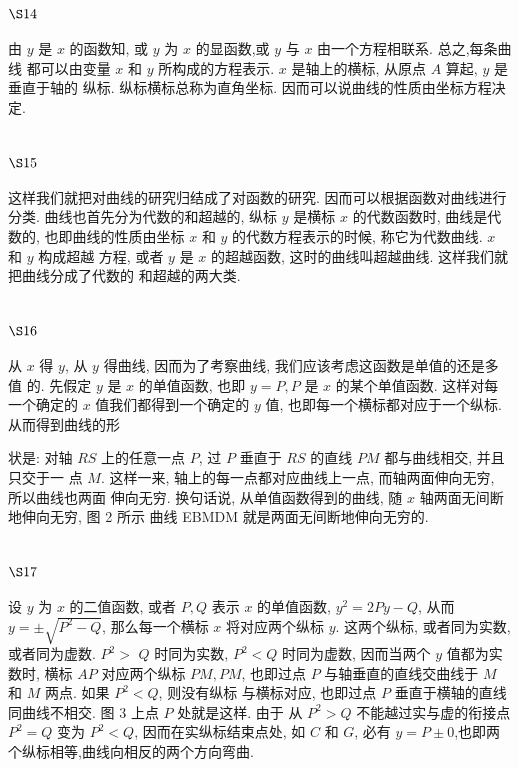 \section{$\S 14$}

由 $y$ 是 $x$ 的函数知, 或 $y$ 为 $x$ 的显函数,或 $y$ 与 $x$ 由一个方程相联系. 总之,每条曲线 都可以由变量 $x$ 和 $y$ 所构成的方程表示. $x$ 是轴上的横标, 从原点 $A$ 算起, $y$ 是垂直于轴的 纵标. 纵标横标总称为直角坐标. 因而可以说曲线的性质由坐标方程决定.

\section{$\S 15$}

这样我们就把对曲线的研究归结成了对函数的研究. 因而可以根据函数对曲线进行 分类. 曲线也首先分为代数的和超越的, 纵标 $y$ 是横标 $x$ 的代数函数时, 曲线是代数的, 也即曲线的性质由坐标 $x$ 和 $y$ 的代数方程表示的时候, 称它为代数曲线. $x$ 和 $y$ 构成超越 方程, 或者 $y$ 是 $x$ 的超越函数, 这时的曲线叫超越曲线. 这样我们就把曲线分成了代数的 和超越的两大类.

\section{$\S 16$}

从 $x$ 得 $y$, 从 $y$ 得曲线, 因而为了考察曲线, 我们应该考虑这函数是单值的还是多值 的. 先假定 $y$ 是 $x$ 的单值函数, 也即 $y=P, P$ 是 $x$ 的某个单值函数. 这样对每一个确定的 $x$ 值我们都得到一个确定的 $y$ 值, 也即每一个横标都对应于一个纵标. 从而得到曲线的形

状是: 对轴 $R S$ 上的任意一点 $P$, 过 $P$ 垂直于 $R S$ 的直线 $P M$ 都与曲线相交, 并且只交于一 点 $M$. 这样一来, 轴上的每一点都对应曲线上一点, 而轴两面伸向无穷, 所以曲线也两面 伸向无穷. 换句话说, 从单值函数得到的曲线, 随 $x$ 轴两面无间断地伸向无穷, 图 2 所示 曲线 EBMDM 就是两面无间断地伸向无穷的.

\section{$\S 17$}

设 $y$ 为 $x$ 的二值函数, 或者 $P, Q$ 表示 $x$ 的单值函数, $y^{2}=2 P y-Q$, 从而 $y=\pm \sqrt{P^{2}-Q}$, 那么每一个横标 $x$ 将对应两个纵标 $y$. 这两个纵标, 或者同为实数, 或者同为虚数. $P^{2}>$ $Q$ 时同为实数, $P^{2}<Q$ 时同为虚数, 因而当两个 $y$ 值都为实数时, 横标 $A P$ 对应两个纵标 $P M, P M$, 也即过点 $P$ 与轴垂直的直线交曲线于 $M$ 和 $M$ 两点. 如果 $P^{2}<Q$, 则没有纵标 与横标对应, 也即过点 $P$ 垂直于横轴的直线同曲线不相交. 图 3 上点 $P$ 处就是这样. 由于 从 $P^{2}>Q$ 不能越过实与虚的衔接点 $P^{2}=Q$ 变为 $P^{2}<Q$, 因而在实纵标结束点处, 如 $C$ 和 $G$, 必有 $y=P \pm 0$,也即两个纵标相等,曲线向相反的两个方向弯曲. 


